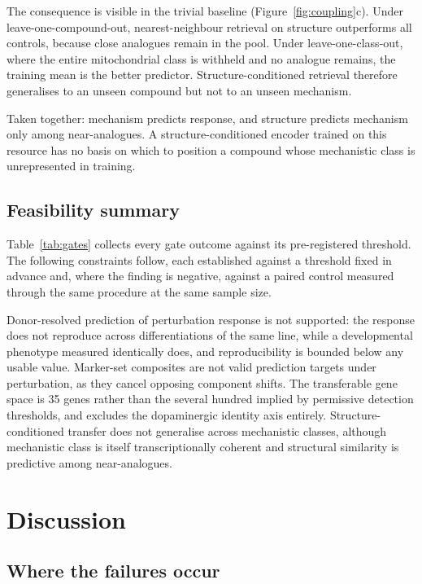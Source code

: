 \documentclass[5p,times,twocolumn]{elsarticle}
\begin{document}
The consequence is visible in the trivial baseline
(Figure~\ref{fig:coupling}c). Under leave-one-compound-out, nearest-neighbour
retrieval on structure outperforms all controls, because close analogues remain
in the pool. Under leave-one-class-out, where the entire mitochondrial class is
withheld and no analogue remains, the training mean is the better predictor.
Structure-conditioned retrieval therefore generalises to an unseen compound but
not to an unseen mechanism.

Taken together: mechanism predicts response, and structure predicts mechanism
only among near-analogues. A structure-conditioned encoder trained on this
resource has no basis on which to position a compound whose mechanistic class is
unrepresented in training.

\subsection{\textbf{Feasibility summary}}

Table~\ref{tab:gates} collects every gate outcome against its pre-registered
threshold. The following constraints follow, each established against a
threshold fixed in advance and, where the finding is negative, against a paired
control measured through the same procedure at the same sample size.

Donor-resolved prediction of perturbation response is not supported: the
response does not reproduce across differentiations of the same line, while a
developmental phenotype measured identically does, and reproducibility is
bounded below any usable value. Marker-set composites are not valid prediction
targets under perturbation, as they cancel opposing component shifts. The
transferable gene space is 35 genes rather than the several hundred implied by
permissive detection thresholds, and excludes the dopaminergic identity axis
entirely. Structure-conditioned transfer does not generalise across mechanistic
classes, although mechanistic class is itself transcriptionally coherent and
structural similarity is predictive among near-analogues.

\section{\textbf{Discussion}}
 
\subsection{\textbf{Where the failures occur}}
 
\end{document}

